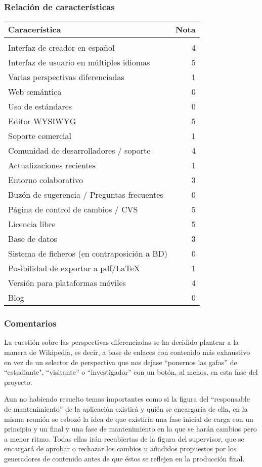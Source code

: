 \subsubsection{Relación de características}

\begin{tabular}{l @{\hspace{10px}} r}
Caracerística & Nota \\
\hline \\
Interfaz de creador en español & 4 \\
Interfaz de usuario en múltiples idiomas & 5 \\	
Varias perspectivas diferenciadas & 1 \\
Web semántica & 0 \\
Uso de estándares & 0 \\
Editor WYSIWYG & 5 \\
Soporte comercial & 1 \\
Comunidad de desarrolladores / soporte & 4 \\
Actualizaciones recientes & 1 \\
Entorno colaborativo & 3 \\
Buzón de sugerencia / Preguntas frecuentes & 0 \\
Página de control de cambios / CVS & 5 \\
Licencia libre & 5 \\
Base de datos & 3 \\
Sistema de ficheros (en contraposición a BD) & 0 \\
Posibilidad de exportar a pdf/LaTeX & 1 \\
Versión para plataformas móviles & 4 \\
Blog & 0 \\
\end{tabular}

\subsubsection{Comentarios}

\par La cuestión sobre las perspectivas diferenciadas se ha decidido plantear a la manera de Wikipedia, es decir, a base de enlaces con contenido más exhaustivo en vez de un selector de perspectiva que nos dejase ``ponernos las gafas'' de ``estudiante", ``visitante'' o ``investigador'' con un botón, al menos, en esta fase del proyecto.

\par Aun no habiendo resuelto temas importantes como si la figura del ``responsable de mantenimiento'' de la aplicación existirá y quién se encargaría de ella, en la misma reunión se esbozó la idea de que existiría una fase inicial de carga con un principio y un final y una fase de mantenimiento en la que se harán cambios pero a menor ritmo. Todas ellas irán recubiertas de la figura del supervisor, que se encargará de aprobar o rechazar los cambios u añadidos propuestos por los generadores de contenido antes de que éstos se reflejen en la producción final.

